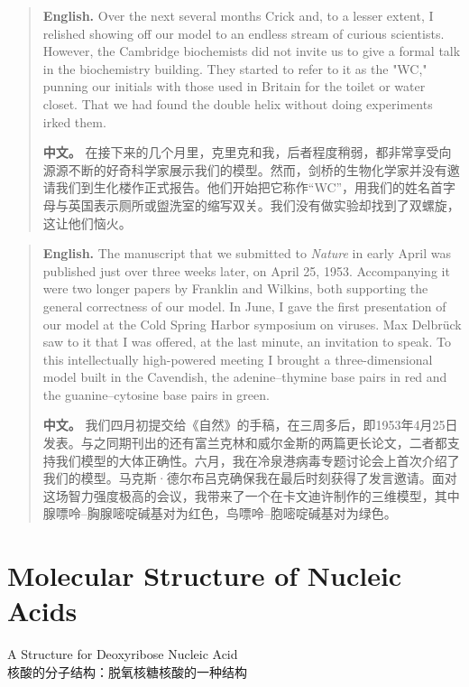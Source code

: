 \begin{quote}
\noindent\textbf{English.} Over the next several months Crick and, to a lesser extent, I relished showing off our model to an endless stream of curious scientists. However, the Cambridge biochemists did not invite us to give a formal talk in the biochemistry building. They started to refer to it as the "WC," punning our initials with those used in Britain for the toilet or water closet. That we had found the double helix without doing experiments irked them.

\smallskip
\noindent\textbf{中文。} 在接下来的几个月里，克里克和我，后者程度稍弱，都非常享受向源源不断的好奇科学家展示我们的模型。然而，剑桥的生物化学家并没有邀请我们到生化楼作正式报告。他们开始把它称作“WC”，用我们的姓名首字母与英国表示厕所或盥洗室的缩写双关。我们没有做实验却找到了双螺旋，这让他们恼火。
\end{quote}

\begin{quote}
\noindent\textbf{English.} The manuscript that we submitted to \emph{Nature} in early April was published just over three weeks later, on April 25, 1953. Accompanying it were two longer papers by Franklin and Wilkins, both supporting the general correctness of our model. In June, I gave the first presentation of our model at the Cold Spring Harbor symposium on viruses. Max Delbrück saw to it that I was offered, at the last minute, an invitation to speak. To this intellectually high-powered meeting I brought a three-dimensional model built in the Cavendish, the adenine--thymine base pairs in red and the guanine--cytosine base pairs in green.

\smallskip
\noindent\textbf{中文。} 我们四月初提交给《自然》的手稿，在三周多后，即1953年4月25日发表。与之同期刊出的还有富兰克林和威尔金斯的两篇更长论文，二者都支持我们模型的大体正确性。六月，我在冷泉港病毒专题讨论会上首次介绍了我们的模型。马克斯·德尔布吕克确保我在最后时刻获得了发言邀请。面对这场智力强度极高的会议，我带来了一个在卡文迪许制作的三维模型，其中腺嘌呤--胸腺嘧啶碱基对为红色，鸟嘌呤--胞嘧啶碱基对为绿色。
\end{quote}

\section*{Molecular Structure of Nucleic Acids}
\begin{center}
\large A Structure for Deoxyribose Nucleic Acid\\
\large 核酸的分子结构：脱氧核糖核酸的一种结构
\end{center}

